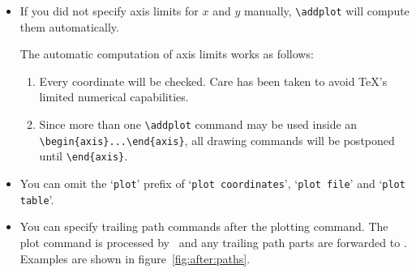 \begin{itemize}
	\item If you did not specify axis limits for $x$ and $y$ manually, \lstinline!\addplot! will compute them automatically. 

	The automatic computation of axis limits works as follows:
		\begin{enumerate}
			\item Every coordinate will be checked. Care has been taken to avoid \TeX's limited numerical capabilities.
			\item Since more than one \lstinline!\addplot! command may be used inside an \lstinline!\begin{axis}...\end{axis}!, all drawing commands will be postponed until \lstinline!\end{axis}!.
		\end{enumerate}

	\item You can omit the `\texttt{plot}' prefix of `\texttt{plot coordinates}', `\texttt{plot file}' and `\texttt{plot table}'.

	\item You can specify trailing path commands after the plotting command. The plot command is processed by \PGFPlots\ and any trailing path parts are forwarded to \Tikz. Examples are shown in figure~\ref{fig:after:paths}.
\end{itemize}
